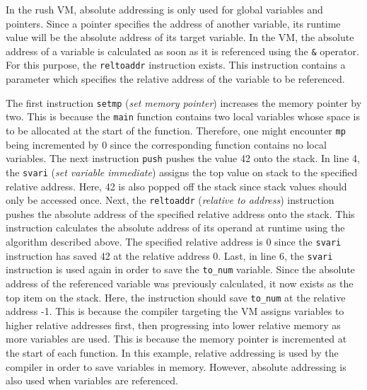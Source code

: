 
In the rush VM, absolute addressing is only used for global variables and pointers.
Since a pointer specifies the address of another variable, its runtime value will be the absolute address of its target variable.
In the VM, the absolute address of a variable is calculated as soon as it is referenced using the \texttt{\&} operator.
For this purpose, the \texttt{reltoaddr} instruction exists.
This instruction contains a parameter which specifies the relative address of the variable to be referenced.


The first instruction \texttt{setmp} (\emph{set memory pointer}) increases the memory pointer by two.
This is because the \texttt{main} function contains two local variables whose space is to be allocated at the start of the function.
Therefore, one might encounter \texttt{mp} being incremented by 0 since the corresponding function contains no local variables.
The next instruction \texttt{push} pushes the value 42 onto the stack.
In line 4, the \texttt{svari} (\emph{set variable immediate}) assigns the top value on stack to the specified relative address.
Here, 42 is also popped off the stack since stack values should only be accessed once.
Next, the \texttt{reltoaddr} (\emph{relative to address}) instruction pushes the absolute address of the specified relative address onto the stack.
This instruction calculates the absolute address of its operand at runtime using the algorithm described above.
The specified relative address is 0 since the \texttt{svari} instruction has saved 42 at the relative address 0.
Last, in line 6, the \texttt{svari} instruction is used again in order to save the \texttt{to\_num} variable.
Since the absolute address of the referenced variable was previously calculated, it now exists as the top item on the stack.
Here, the instruction should save \texttt{to\_num} at the relative address -1.
This is because the compiler targeting the VM assigns variables to higher relative addresses first, then progressing into lower relative memory as more variables are used.
This is because the memory pointer is incremented at the start of each function.
In this example, relative addressing is used by the compiler in order to save variables in memory.
However, absolute addressing is also used when variables are referenced.

